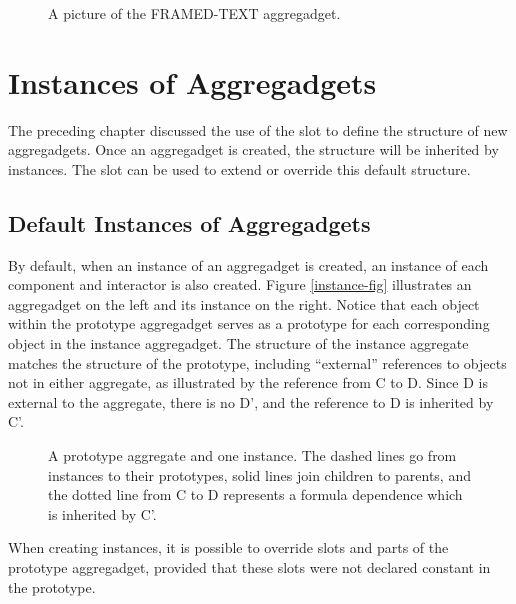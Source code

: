 \begin{figure}
\begin{center}
\end{center}
\caption{A picture of the FRAMED-TEXT aggregadget.}
\end{figure}



\section{Instances of Aggregadgets}
\label{agg-insts}
The preceding chapter discussed the use of the  slot
to define the structure of new aggregadgets.  Once an aggregadget
is created, the structure will be inherited by instances.  The
 slot can be used to extend or override this default
structure.

\subsection{Default Instances of Aggregadgets}
\label{instances-sec}
By default, when an instance of an aggregadget is created,
an instance of each component and interactor is also created.
Figure
\ref{instance-fig} illustrates an aggregadget on the left and its instance
on the right.  Notice that each object within the prototype aggregadget
serves as a prototype for each corresponding object in the instance
aggregadget.  The structure of the instance aggregate matches the structure
of the prototype, including ``external'' references to objects not in either
aggregate, as illustrated by the reference from C to D.  Since D is external
to the aggregate, there is no D', and the reference to D is inherited by C'.


\begin{figure}
\begin{center}
\end{center}
\caption{A prototype aggregate and one instance.  The dashed lines
go from instances to their prototypes, solid lines
join children to parents, and the dotted line from C to D represents
a formula dependence which is inherited by C'.}
\end{figure}

When creating instances, it is possible to override slots and parts
of the prototype aggregadget, provided that these slots were not declared
constant in the prototype.


